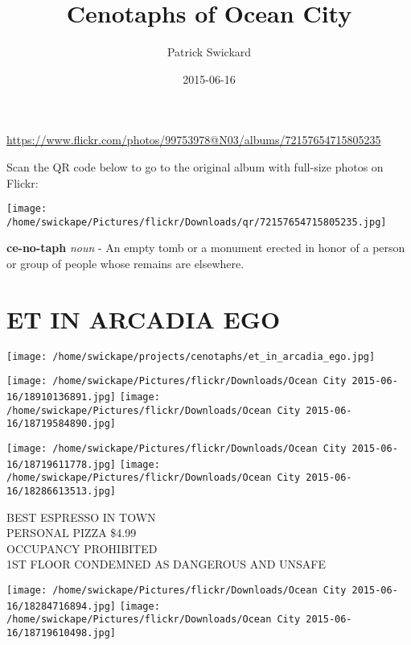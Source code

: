 \documentclass[10pt,letterpaper]{article}
\title{Cenotaphs of Ocean City}
\author{Patrick Swickard}
\date{2015-06-16}
\begin{document}
\maketitle

\url{https://www.flickr.com/photos/99753978@N03/albums/72157654715805235}

Scan the QR code below to go to the original album with full-size photos on Flickr:

\texttt{[image: /home/swickape/Pictures/flickr/Downloads/qr/72157654715805235.jpg]}
\pagebreak

\newpage\null\thispagestyle{empty}\newpage

\pagebreak

\vspace*{4in}
\textbf{ce-no-taph} \textit{noun} - An empty tomb or a monument erected in honor of a person or group of people whose remains are elsewhere.

\newpage\null\thispagestyle{empty}\newpage

\pagebreak

\vspace*{3in}
\section*{ET IN ARCADIA EGO}
\vspace*{1in}
\texttt{[image: /home/swickape/projects/cenotaphs/et\_in\_arcadia\_ego.jpg]}


\pagebreak

\newpage\null\thispagestyle{empty}\newpage

\pagebreak
\texttt{[image: /home/swickape/Pictures/flickr/Downloads/Ocean City 2015-06-16/18910136891.jpg]}
\texttt{[image: /home/swickape/Pictures/flickr/Downloads/Ocean City 2015-06-16/18719584890.jpg]}

\texttt{[image: /home/swickape/Pictures/flickr/Downloads/Ocean City 2015-06-16/18719611778.jpg]}
\texttt{[image: /home/swickape/Pictures/flickr/Downloads/Ocean City 2015-06-16/18286613513.jpg]}

BEST ESPRESSO IN TOWN\\
PERSONAL PIZZA \$4.99\\
OCCUPANCY PROHIBITED\\
1ST FLOOR CONDEMNED AS DANGEROUS AND UNSAFE
\pagebreak

\texttt{[image: /home/swickape/Pictures/flickr/Downloads/Ocean City 2015-06-16/18284716894.jpg]}
\texttt{[image: /home/swickape/Pictures/flickr/Downloads/Ocean City 2015-06-16/18719610498.jpg]}
\end{document}
